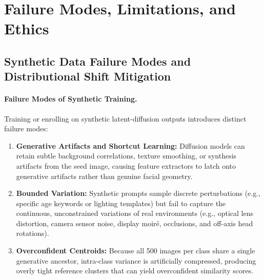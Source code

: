 \documentclass{article}
\begin{document}
\section{Failure Modes, Limitations, and Ethics}

\subsection{Synthetic Data Failure Modes and Distributional Shift Mitigation}

\paragraph{Failure Modes of Synthetic Training.}
Training or enrolling on synthetic latent-diffusion outputs introduces distinct failure modes:
\begin{enumerate}
    \item \textbf{Generative Artifacts and Shortcut Learning:} Diffusion models can retain subtle background correlations, texture smoothing, or synthesis artifacts from the seed image, causing feature extractors to latch onto generative artifacts rather than genuine facial geometry.
    \item \textbf{Bounded Variation:} Synthetic prompts sample discrete perturbations (e.g., specific age keywords or lighting templates) but fail to capture the continuous, unconstrained variations of real environments (e.g., optical lens distortion, camera sensor noise, display moir\'{e}, occlusions, and off-axis head rotations).
    \item \textbf{Overconfident Centroids:} Because all 500 images per class share a single generative ancestor, intra-class variance is artificially compressed, producing overly tight reference clusters that can yield overconfident similarity scores.
\end{enumerate}
\end{document}
